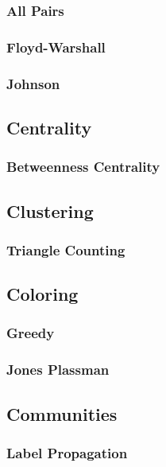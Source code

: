 \subsubsection{All Pairs}
\subsubsection{Floyd-Warshall}
\subsubsection{Johnson}

\subsection{Centrality}
\subsubsection{Betweenness Centrality}

\subsection{Clustering}
\subsubsection{Triangle Counting}

\subsection{Coloring}
\subsubsection{Greedy}
\subsubsection{Jones Plassman}

\subsection{Communities}
\subsubsection{Label Propagation}
